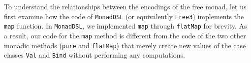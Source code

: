 To understand the relationships between the encodings of the free
monad, let us first examine how the code of \lstinline!MonadDSL!
(or equivalently \lstinline!Free3!)
implements the \lstinline!map!
function. In \lstinline!MonadDSL!,
we implemented \lstinline!map!
through \lstinline!flatMap!
for brevity. As a result, our code for the \lstinline!map!
method is different from the code of the two other monadic methods
(\lstinline!pure! and \lstinline!flatMap!)
that merely create new values of the case classes \lstinline!Val!
and \lstinline!Bind! without
performing any computations.

